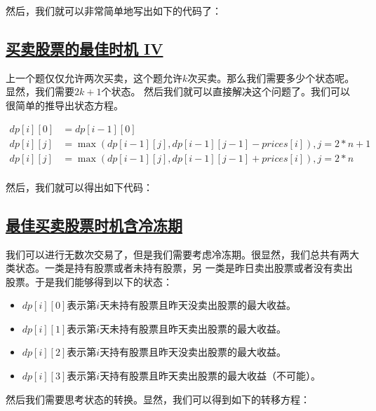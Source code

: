 \documentclass[../../main.tex]{subfiles}
\begin{document}
然后，我们就可以非常简单地写出如下的代码了：



\subsection{\href{https://leetcode-cn.com/problems/best-time-to-buy-and-sell-stock-iv/}{买卖股票的最佳时机 IV}}

上一个题仅仅允许两次买卖，这个题允许$k$次买卖。那么我们需要多少个状态呢。显然，我们需要$2k + 1$个状态。
然后我们就可以直接解决这个问题了。我们可以很简单的推导出状态方程。

\begin{align*}
  dp[i][0] &= dp[i - 1][0] \\
  dp[i][j] &= \max(dp[i - 1][j], dp[i - 1][j - 1] - prices[i]), j = 2 * n + 1 \\
  dp[i][j] &= \max(dp[i - 1][j], dp[i - 1][j - 1] + prices[i]), j = 2 * n \\
\end{align*}

然后，我们就可以得出如下代码：



\subsection{\href{https://leetcode-cn.com/problems/best-time-to-buy-and-sell-stock-with-cooldown/}
{最佳买卖股票时机含冷冻期}}

我们可以进行无数次交易了，但是我们需要考虑冷冻期。很显然，我们总共有两大类状态。一类是持有股票或者未持有股票，另
一类是昨日卖出股票或者没有卖出股票。于是我们能够得到以下的状态：

\begin{itemize}
  \item $dp[i][0]$表示第$i$天未持有股票且昨天没卖出股票的最大收益。
  \item $dp[i][1]$表示第$i$天未持有股票且昨天卖出股票的最大收益。
  \item $dp[i][2]$表示第$i$天持有股票且昨天没卖出股票的最大收益。
  \item $dp[i][3]$表示第$i$天持有股票且昨天卖出股票的最大收益（不可能）。
\end{itemize}

然后我们需要思考状态的转换。显然，我们可以得到如下的转移方程：
\end{document}
